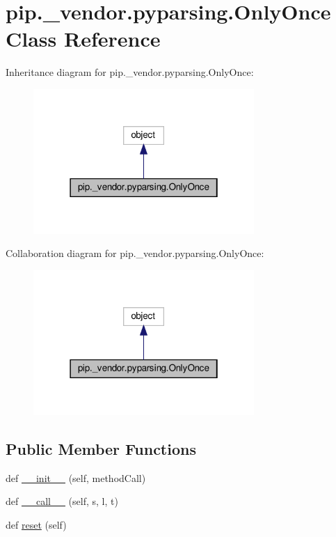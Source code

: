 \hypertarget{classpip_1_1__vendor_1_1pyparsing_1_1OnlyOnce}{}\section{pip.\+\_\+vendor.\+pyparsing.\+Only\+Once Class Reference}
\label{classpip_1_1__vendor_1_1pyparsing_1_1OnlyOnce}


Inheritance diagram for pip.\+\_\+vendor.\+pyparsing.\+Only\+Once\+:
\nopagebreak
\begin{figure}[H]
\begin{center}
\leavevmode
\includegraphics[width=238pt]{classpip_1_1__vendor_1_1pyparsing_1_1OnlyOnce__inherit__graph}
\end{center}
\end{figure}


Collaboration diagram for pip.\+\_\+vendor.\+pyparsing.\+Only\+Once\+:
\nopagebreak
\begin{figure}[H]
\begin{center}
\leavevmode
\includegraphics[width=238pt]{classpip_1_1__vendor_1_1pyparsing_1_1OnlyOnce__coll__graph}
\end{center}
\end{figure}
\subsection*{Public Member Functions}
\begin{DoxyCompactItemize}
\item 
def \hyperlink{classpip_1_1__vendor_1_1pyparsing_1_1OnlyOnce_a1740629229edd90ff9552f2776c76025}{\+\_\+\+\_\+init\+\_\+\+\_\+} (self, method\+Call)
\item 
def \hyperlink{classpip_1_1__vendor_1_1pyparsing_1_1OnlyOnce_a2eb8c76ede0a7a0bc39389a2026ec8df}{\+\_\+\+\_\+call\+\_\+\+\_\+} (self, s, l, t)
\item 
def \hyperlink{classpip_1_1__vendor_1_1pyparsing_1_1OnlyOnce_af18ba1d2e78fd69ab6b1a4ff09bbbd50}{reset} (self)
\end{DoxyCompactItemize}
